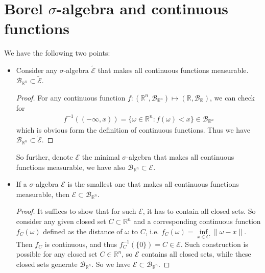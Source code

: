 \documentclass[11pt,a4paper]{article}
\numberwithin{equation}{section}%
\begin{document}
\section{Borel $ \sigma  $-algebra and continuous functions}

We have the following two points:
\begin{itemize}[topsep=2pt,itemsep=0pt]
    \item Consider any $ \sigma  $-algebra $ \tilde{\mathcal{E}} $ that makes all continuous functions measurable. $ \mathcal{B}_{\mathbb{R}^n} \subset \tilde{\mathcal{E}} $.
    
    \begin{proof}
        For any continuous function $ f:(\mathbb{R}^n, \mathcal{B}_{\mathbb{R}^n})\mapsto (\mathbb{R}, \mathcal{B}_{\mathbb{R}}) $, we can check for
        \begin{align*}
            f^{-1}((-\infty, x)) = \{\omega \in \mathbb{R}^n: f(\omega )< x\} \in \mathcal{B}_{\mathbb{R}^n}
        \end{align*}
        which is obvious form the definition of continuous functions. Thus we have $ \mathcal{B}_{\mathbb{R}^n} \subset \tilde{\mathcal{E}} $.
    \end{proof}

    So further, denote $ \mathcal{E} $ the minimal $ \sigma  $-algebra that makes all continuous functions measurable, we have also $ \mathcal{B}_{\mathbb{R}^n} \subset \mathcal{E} $.

    \item If a $ \sigma  $-algebra $ \mathcal{E} $ is the smallest one that makes all continuous functions measurable, then $ \mathcal{E} \subset \mathcal{B}_{\mathbb{R}^n} $.
    
    \begin{proof}
        It suffices to show that for such $ \mathcal{E} $, it has to contain all closed sets. So consider any given closed set $ C\subset \mathbb{R}^n $ and a corresponding continuous function $ f_C(\omega ) $ defined as the distance of $ \omega  $ to $ C $, i.e. $ f_C(\omega ) = \mathop{ \inf  }\limits_{x\in C} \|\omega -x\| $. Then $ f_C $ is continuous, and thus $ f_C^{-1}(\{0\}) = C\in \mathcal{E} $. Such construction is possible for any closed set $ C\in\mathbb{R}^n $, so $ \mathcal{E} $ contains all closed sets, while these closed sets generate $ \mathcal{B}_{\mathbb{R}^n} $. So we have $ \mathcal{E} \subset \mathcal{B}_{\mathbb{R}^n} $.
    \end{proof}
\end{itemize}
    
\end{document}
